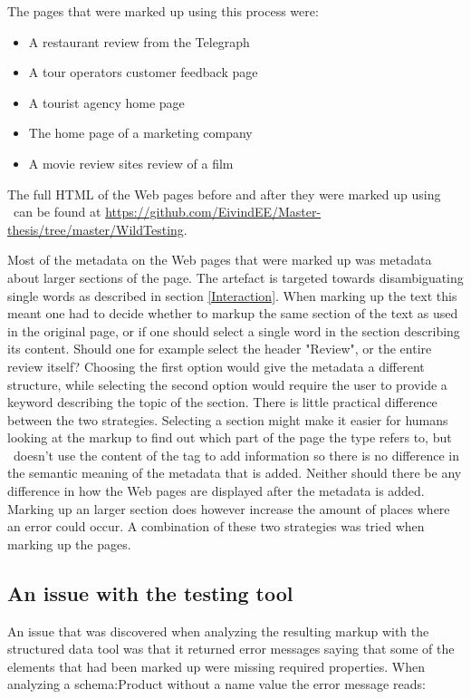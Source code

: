 The pages that were marked up using this process were:
\begin{itemize}
	\item A restaurant review from the Telegraph
	\item A tour operators customer feedback page
	\item A tourist agency home page
	\item The home page of a marketing company
	\item A movie review sites review of a film
\end{itemize}

The full HTML of the Web pages before and after they were marked up using \theartefact\ can be found at
\url{https://github.com/EivindEE/Master-thesis/tree/master/WildTesting}.

Most of the metadata on the Web pages that were marked up was metadata about larger sections of the page.
The artefact is targeted towards disambiguating single words as described in section \ref{Interaction}.
When marking up the text this meant one had to decide whether to markup the same section of the text as used in the original page,
or if one should select a single word in the section describing its content.
Should one for example select the header "Review", or the entire review itself?
Choosing the first option would give the metadata a different structure,
while selecting the second option would require the user to provide a keyword describing the topic of the section.
There is little practical difference between the two strategies.
Selecting a section might make it easier for humans looking at the markup to find out which part of the page the type refers to,
but \theartefact\ doesn't use the content of the tag to add information so there is no difference in the semantic meaning of the metadata that is added.
Neither should there be any difference in how the Web pages are displayed after the metadata is added.
Marking up an larger section does however increase the amount of places where an error could occur.
A combination of these two strategies was tried when marking up the pages.

\subsection{An issue with the testing tool}
An issue that was discovered when analyzing the resulting markup with the structured data tool was that
it returned  error messages saying that some of the elements that had been marked up were missing required properties.
When analyzing a schema:Product without a name value the error message reads:

